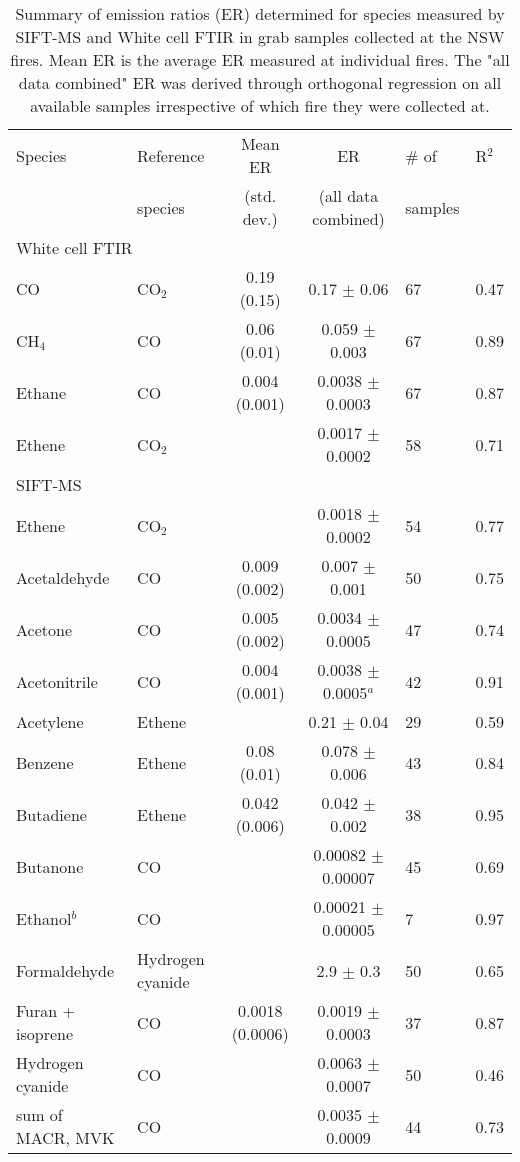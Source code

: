 \documentclass[acp, manuscript]{copernicus}
\begin{document}
\begin{table}
  \caption{Summary of emission ratios (ER) determined for species measured by SIFT-MS and White cell FTIR in grab samples collected at the NSW fires. Mean ER is the average ER measured at individual fires. The "all data combined" ER was derived through orthogonal regression on all available samples irrespective of which fire they were collected at.
  }
  \begin{tabular}{l l c c  l l }
    \tophline
    Species & Reference & Mean ER  & ER   & $\#$ of  & R$^2$ \\
    & species &(std. dev.) & (all data combined)&samples& \\ 
    \hline
    \multicolumn{2}{l}{White cell FTIR} &&&& \\
    \hline
    CO & CO$_2$ & 0.19 (0.15) & 0.17 $\pm$ 0.06 & 67&0.47 \\
    CH$_4$ & CO & 0.06 (0.01) & 0.059 $\pm$ 0.003 &67& 0.89 \\
    Ethane & CO & 0.004 (0.001) & 0.0038 $\pm$ 0.0003 &67& 0.87 \\
    Ethene & CO$_2$ & & 0.0017 $\pm$ 0.0002 &58& 0.71 \\ 
    \hline
    SIFT-MS & & && & \\ 
    \hline
    Ethene & CO$_2$ & & 0.0018 $\pm$ 0.0002&54& 0.77\\
    Acetaldehyde & CO & 0.009 (0.002) & 0.007 $\pm$ 0.001 &50& 0.75\\
    Acetone & CO & 0.005 (0.002) & 0.0034 $\pm$ 0.0005 &47& 0.74 \\
    Acetonitrile & CO & 0.004 (0.001) & 0.0038 $\pm$ 0.0005$^a$ &42& 0.91\\
    Acetylene & Ethene & & 0.21 $\pm$ 0.04 &29& 0.59 \\
    Benzene & Ethene & 0.08 (0.01)& 0.078 $\pm$ 0.006 &43& 0.84 \\
    Butadiene & Ethene & 0.042 (0.006)& 0.042 $\pm$ 0.002 &38& 0.95 \\
    Butanone & CO & & 0.00082 $\pm$ 0.00007 &45& 0.69 \\
    Ethanol$^b$ & CO & & 0.00021 $\pm$ 0.00005 &7& 0.97 \\
    Formaldehyde & Hydrogen cyanide & & 2.9 $\pm$ 0.3 &50& 0.65 \\ 
    Furan + isoprene & CO & 0.0018 (0.0006) & 0.0019 $\pm$ 0.0003 &37& 0.87 \\
    Hydrogen cyanide & CO & & 0.0063 $\pm$ 0.0007 &50& 0.46 \\
    sum of MACR, MVK  & CO & & 0.0035 $\pm$ 0.0009 &44& 0.73 \\

\end{tabular}
\end{table}
\end{document}
